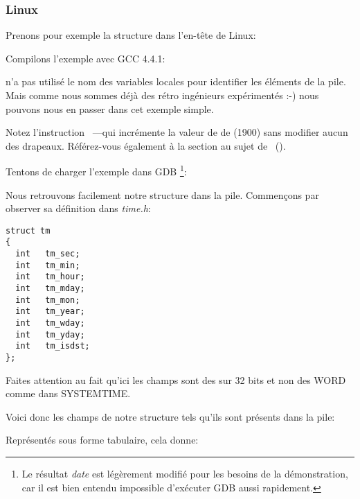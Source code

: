 ﻿\subsubsection{Linux}

Prenons pour exemple la structure  dans l'en-tête  de Linux:



Compilons l'exemple avec GCC 4.4.1:



\IDA n'a pas utilisé le nom des variables locales pour identifier les éléments de la pile.
Mais comme nous sommes déjà des rétro ingénieurs expérimentés :-) nous pouvons nous en passer dans
cet exemple simple.


Notez l'instruction ~---qui incrémente la valeur de \EAX de  (1900)
sans modifier aucun des drapeaux. Référez-vous également à la section au sujet de \LEA{}~().


Tentons de charger l'exemple dans GDB \footnote{Le résultat \emph{date} est légèrement modifié pour
les besoins de la démonstration, car il est bien entendu impossible d'exécuter GDB aussi rapidement.}:



Nous retrouvons facilement notre structure dans la pile. Commençons par observer sa définition dans
\emph{time.h}:

\begin{lstlisting}[caption=time.h, label=struct_tm,style=customc]
struct tm
{
  int	tm_sec;
  int	tm_min;
  int	tm_hour;
  int	tm_mday;
  int	tm_mon;
  int	tm_year;
  int	tm_wday;
  int	tm_yday;
  int	tm_isdst;
};
\end{lstlisting}

Faites attention au fait qu'ici les champs sont des \Tint sur 32 bits et non des WORD comme dans
SYSTEMTIME.

Voici donc les champs de notre structure tels qu'ils sont présents dans la pile:



Représentés sous forme tabulaire, cela donne:

